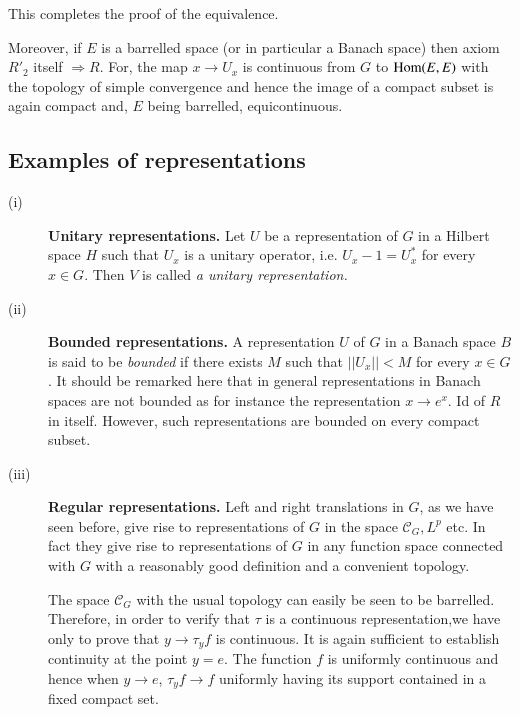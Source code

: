 This completes the proof of the equivalence.

Moreover, if $E$ is a barrelled space (or in particular a Banach
space) then axiom $R'_2$ itself $\Rightarrow R$. For, the map $x
\rightarrow U_x$ is continuous from $G$ to $\operatorname{Hom}(E,E)$ with the
topology of simple convergence and hence the image of a compact subset
is again compact and, $E$ being barrelled, equicontinuous. 

\subsection{Examples of
  representations}\label{partII-chap4-sec4.2}%

\begin{description}
\item[(i)] \textbf{Unitary representations.} Let $U$ be a
  representation of $G$ in a Hilbert space $H$ such that $U_x$ is a
  unitary operator, i.e. $U_x-1 = U^*_x$  for every $x \in G$. Then
  $V$ is called {\em a unitary representation.} 

\item[(ii)] \textbf{Bounded representations.} A representation $U$ of
  $G$ in a Banach space $B$ is said to be \textit{bounded} if there
  exists $M$ such that $|| U_x ||< M$ for every $x\in G$. It should be
  remarked here that in general representations in Banach spaces are
  not bounded as for instance the representation $x\rightarrow
  e^x$. Id of $R$ in itself. However, such representations are bounded
  on every compact subset. 

\item[(iii)] \textbf{Regular representations.} Left and right
  translations in $G$, as we have seen before, give rise to
  representations of $G$ in the space $\mathscr{C}_G, L^p$ etc. In
  fact they give rise to representations of $G$ in any function space
  connected with $G$ with a reasonably good definition and a
  convenient topology.  


The space $\mathscr{C}_G$ with the usual topology can easily be seen
to be barrelled. Therefore, in order to verify that $\tau$ is a
continuous representation,\pageoriginale we have only to prove that
$y\rightarrow\tau_y f$ is continuous. It is again sufficient to
establish continuity at the point $y = e$. The function $f$ is
uniformly continuous and hence when $y \rightarrow e$,
$\tau_y f\rightarrow  f$ uniformly having its support contained in a
fixed compact set. 


\end{description}
